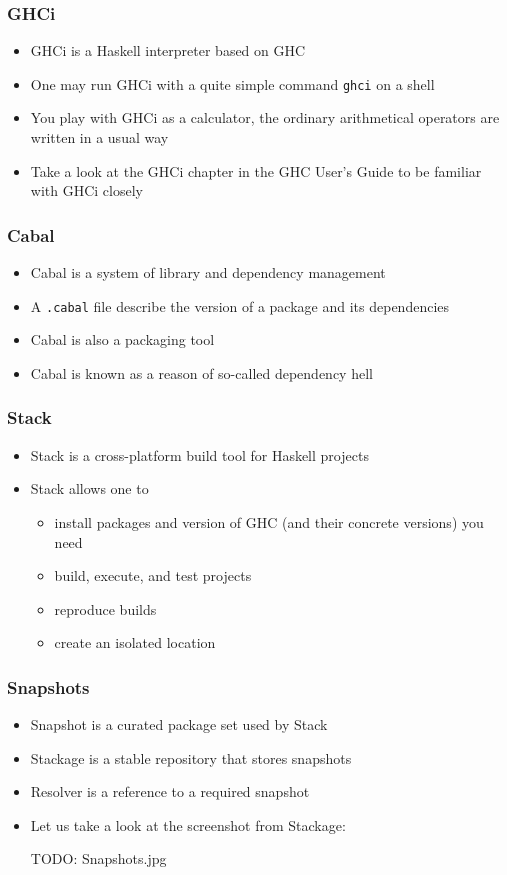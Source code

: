 \documentclass[10pt,pdf,utf8,russian,aspectratio=169]{beamer}
\begin{document}
\begin{frame}
  \frametitle{GHCi}

  \begin{itemize}
    \item GHCi is a Haskell interpreter based on GHC
    \item One may run GHCi with a quite simple command \verb"ghci" on a shell
    \item You play with GHCi as a calculator, the ordinary arithmetical operators are written in a usual way
    \item Take a look at the GHCi chapter in the GHC User's Guide to be familiar with GHCi closely
  \end{itemize}
\end{frame}

\begin{frame}
  \frametitle{Cabal}

  \begin{itemize}
    \item Cabal is a system of library and dependency management
    \item A \verb".cabal" file describe the version of a package and its dependencies
    \item Cabal is also a packaging tool
    \item Cabal is known as a reason of so-called dependency hell
  \end{itemize}
\end{frame}

\begin{frame}
  \frametitle{Stack}

  \begin{itemize}
    \item Stack is a cross-platform build tool for Haskell projects
    \item Stack allows one to
    \begin{itemize}
      \item install packages and version of GHC (and their concrete versions) you need
      \item build, execute, and test projects
      \item reproduce builds
      \item create an isolated location
    \end{itemize}
  \end{itemize}
\end{frame}

\begin{frame}
  \frametitle{Snapshots}

  \begin{itemize}
    \item Snapshot is a curated package set used by Stack
    \item Stackage is a stable repository that stores snapshots
    \item Resolver is a reference to a required snapshot
    \item Let us take a look at the screenshot from Stackage:

    TODO: Snapshots.jpg
  \end{itemize}
\end{frame}
\end{document}
